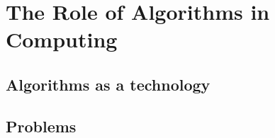 \chapter{The Role of Algorithms in Computing}
\setcounter{section}{1}

\section{Algorithms as a technology}
\setcounter{subsection}{1}
\renewcommand{\thesubsection}{Exercise \thesection-\arabic{subsection}}
\subsection{}

\subsection{}


\section*{Problems}
\setcounter{subsection}{0}
\renewcommand{\thesubsection}{Problem \thechapter-\arabic{subsection}}
\subsection{}

